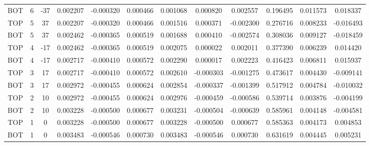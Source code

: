 \begin{landscape}
\begin{table}
\begin{tabular}{|ccc|ccc|ccc|ccc|}
BOT &    6 &    -37 &  0.002207 & -0.000320 &  0.000466 &  0.001068 &  0.000820 &  0.002557 &       0.196495 &       0.011573 &       0.018337 \\
TOP &    5 &     37 &  0.002207 & -0.000320 &  0.000466 &  0.001516 &  0.000371 & -0.002300 &       0.276716 &       0.008233 &      -0.016493 \\
BOT &    5 &     37 &  0.002462 & -0.000365 &  0.000519 &  0.001688 &  0.000410 & -0.002574 &       0.308036 &       0.009127 &      -0.018459 \\
TOP &    4 &    -17 &  0.002462 & -0.000365 &  0.000519 &  0.002075 &  0.000022 &  0.002011 &       0.377390 &       0.006239 &       0.014420 \\
BOT &    4 &    -17 &  0.002717 & -0.000410 &  0.000572 &  0.002290 &  0.000017 &  0.002223 &       0.416423 &       0.006811 &       0.015937 \\
TOP &    3 &     17 &  0.002717 & -0.000410 &  0.000572 &  0.002610 & -0.000303 & -0.001275 &       0.473617 &       0.004430 &      -0.009141 \\
BOT &    3 &     17 &  0.002972 & -0.000455 &  0.000624 &  0.002854 & -0.000337 & -0.001399 &       0.517912 &       0.004784 &      -0.010032 \\
TOP &    2 &     10 &  0.002972 & -0.000455 &  0.000624 &  0.002976 & -0.000459 & -0.000586 &       0.539714 &       0.003876 &      -0.004199 \\
BOT &    2 &     10 &  0.003228 & -0.000500 &  0.000677 &  0.003231 & -0.000504 & -0.000639 &       0.585961 &       0.004148 &      -0.004581 \\
TOP &    1 &      0 &  0.003228 & -0.000500 &  0.000677 &  0.003228 & -0.000500 &  0.000677 &       0.585363 &       0.004173 &       0.004853 \\
BOT &    1 &      0 &  0.003483 & -0.000546 &  0.000730 &  0.003483 & -0.000546 &  0.000730 &       0.631619 &       0.004445 &       0.005231 \\
\bottomrule
\end{tabular}
\end{table}


\end{landscape}
